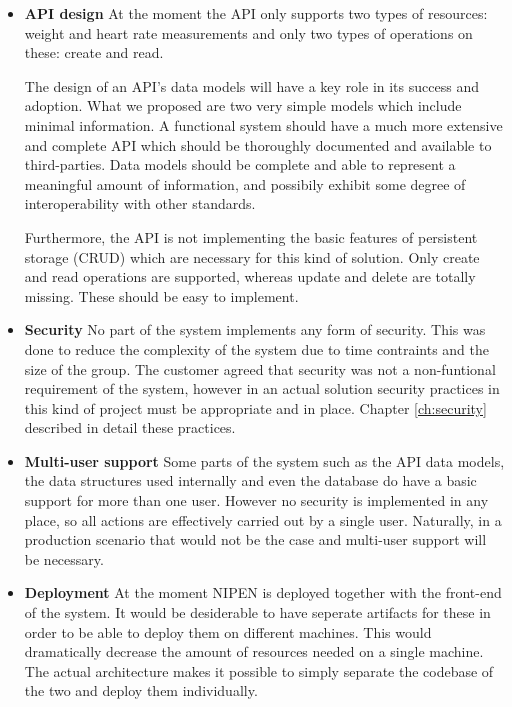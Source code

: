 \begin{itemize}
\item\textbf{API design}\newline
At the moment the API only supports two types of resources: weight and heart rate measurements
and only two types of operations on these: create and read.

The design of an API's data models will have a key role in its success and adoption.
What we proposed are two very simple models which include minimal information.
A functional system should have a much more extensive and complete API
which should be thoroughly documented and available to third-parties.
Data models should be complete and able to represent a meaningful amount of information,
and possibily exhibit some degree of interoperability with other standards.

Furthermore, the API is not implementing the basic features of persistent storage (CRUD)
which are necessary for this kind of solution. Only create and read operations are supported,
whereas update and delete are totally missing. These should be easy to implement.

\item\textbf{Security}\newline
No part of the system implements any form of security.
This was done to reduce the complexity of the system due to time contraints and the size of the group.
The customer agreed that security was not a non-funtional requirement of the system, however
in an actual solution security practices in this kind of project must be appropriate and in place.
Chapter \ref{ch:security} described in detail these practices.

\item\textbf{Multi-user support}\newline
Some parts of the system such as the API data models, the data structures used internally and even
the database do have a basic support for more than one user. However no security
is implemented in any place, so all actions are effectively carried out by a single user.
Naturally, in a production scenario that would not be the case and multi-user support will
be necessary.

\item\textbf{Deployment}\newline
At the moment NIPEN is deployed together with the front-end of the system.
It would be desiderable to have seperate artifacts for these in order to be able to deploy them
on different machines. This would dramatically decrease the amount of resources needed on a single
machine. The actual architecture makes it possible to simply separate the codebase of the two
and deploy them individually.
\end{itemize}
\fi

